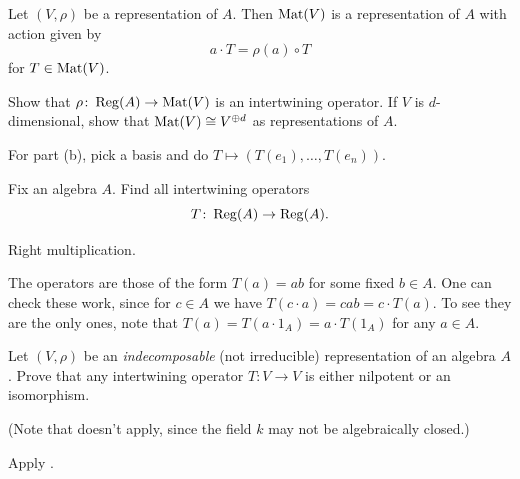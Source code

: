 \begin{sproblem}
	\label{prob:reg_mat}
	Let $(V, \rho)$ be a representation of $A$.
	Then $\mathrm{Mat}(V)$ is a representation of $A$
	with action given by
	\[ a \cdot T = \rho(a) \circ T \]
	for $T \in \mathrm{Mat}(V)$.
	\begin{enumerate}[(a)]
		\ii Show that $\rho \colon \operatorname{Reg}(A) \to \mathrm{Mat}(V)$ is an intertwining operator.
		\ii If $V$ is $d$-dimensional, show that $\mathrm{Mat}(V) \cong V^{\oplus d}$
		as representations of $A$.
	\end{enumerate}
	\begin{hint}
		For part (b), pick a basis and do $T \mapsto (T(e_1), \dots, T(e_n))$.
	\end{hint}
\end{sproblem}

\begin{sproblem}
	\label{prob:regA_intertwine}
	Fix an algebra $A$.
	Find all intertwining operators
	\[ T \colon \operatorname{Reg}(A) \to \operatorname{Reg}(A). \]
	\begin{hint}
		Right multiplication.
	\end{hint}
	\begin{sol}
		The operators are those of the form $T(a) = ab$
		for some fixed $b \in A$.
		One can check these work, since for $c \in A$
		we have $T(c \cdot a) = cab = c \cdot T(a)$.
		To see they are the only ones, note that
		$T(a) = T(a \cdot 1_A) = a \cdot T(1_A)$ for any $a \in A$.
	\end{sol}
\end{sproblem}

\begin{problem}
	\onechili
	Let $(V, \rho)$ be an \emph{indecomposable}
	(not irreducible) representation of an algebra $A$.
	Prove that any intertwining operator $T \colon V \to V$
	is either nilpotent or an isomorphism.

	(Note that  doesn't apply,
	since the field $k$ may not be algebraically closed.)
	\begin{hint}
		Apply .
	\end{hint}
\end{problem}
